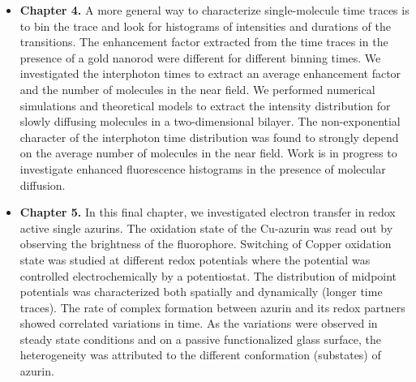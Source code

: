 \begin{itemize}
	\item \textbf{Chapter 4.} A more general way to characterize single-molecule time traces is to bin the trace and look for histograms of intensities and durations of the transitions. The enhancement factor extracted from the time traces in the presence of a gold nanorod were different for different binning times. We investigated the interphoton times to extract an average enhancement factor and the number of molecules in the near field. We performed numerical simulations and theoretical models to extract the intensity distribution for slowly diffusing molecules in a two-dimensional bilayer. The non-exponential character of the interphoton time distribution was found to strongly depend on the average number of molecules in the near field. Work is in progress to investigate enhanced fluorescence histograms in the presence of molecular diffusion.

	\item \textbf{Chapter 5.} In this final chapter, we investigated electron transfer in redox active single azurins. The oxidation state of the Cu-azurin was read out by observing the brightness of the fluorophore. Switching of Copper oxidation state was studied at different redox potentials where the potential was controlled electrochemically by a potentiostat. The distribution of midpoint potentials was characterized both spatially and dynamically (longer time traces). The rate of complex formation between azurin and its redox partners showed correlated variations in time. As the variations were observed in steady state conditions and on a passive functionalized glass surface, the heterogeneity was attributed to the different conformation (substates) of azurin.
\end{itemize}
